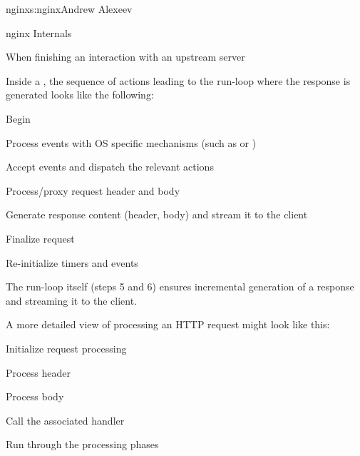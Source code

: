 \begin{aosachapter}{nginx}{s:nginx}{Andrew Alexeev}
\begin{aosasect1}{nginx Internals}
\begin{aosaitemize}
\item When finishing an interaction with an upstream server

\end{aosaitemize}

Inside a , the sequence of actions leading to the
run-loop where the response is generated looks like the following:

\begin{aosaenumerate}

\item Begin 

\item Process events with OS specific mechanisms (such as 
  or )

\item Accept events and dispatch the relevant actions

\item Process/proxy request header and body

\item Generate response content (header, body) and stream it to the
  client

\item Finalize request

\item Re-initialize timers and events

\end{aosaenumerate}

The run-loop itself (steps 5 and 6) ensures incremental generation of
a response and streaming it to the client.


A more detailed view of processing an HTTP request might look like
this:

\begin{aosaenumerate}

\item Initialize request processing

\item Process header

\item Process body

\item Call the associated handler

\item Run through the processing phases

\end{aosaenumerate}


\end{aosasect1}
\end{aosachapter}
